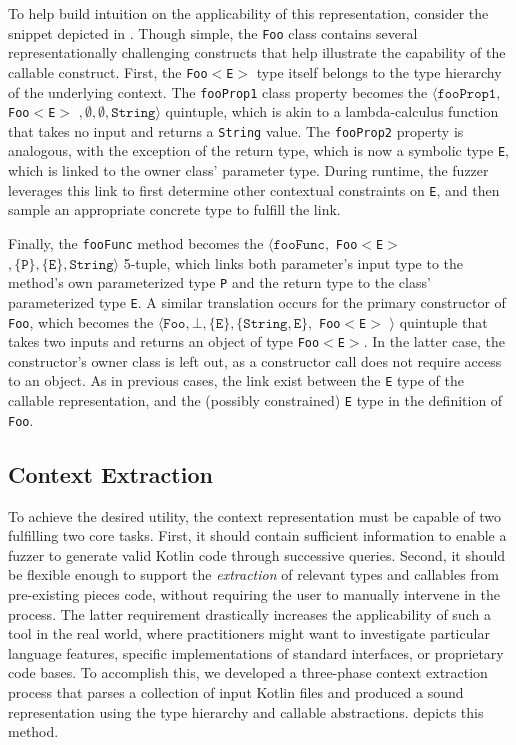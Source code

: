 To help build intuition on the applicability of this representation,
consider the snippet depicted in .
Though simple, the \texttt{Foo} class contains several representationally
challenging constructs that help illustrate the capability of the callable construct.
First, the \texttt{Foo$<$E$>$} type itself belongs to the type hierarchy
of the underlying context. 
The \texttt{fooProp1} class property becomes the
$\langle \texttt{fooProp1},$ \texttt{Foo$<$\texttt{E}$>$} $, \emptyset, \emptyset, \texttt{String} \rangle$
quintuple, which is akin to a lambda-calculus function that takes no input and returns a \texttt{String} value.
The \texttt{fooProp2} property is analogous, with the exception of the return type,
which is now a symbolic type \texttt{E}, which is linked to the owner class' parameter type.
During runtime, the fuzzer leverages this link to first determine other contextual constraints
on \texttt{E}, and then sample an appropriate concrete type to fulfill the link.

Finally, the \texttt{fooFunc} method becomes the 
$\langle \texttt{fooFunc},$ \texttt{Foo$<$\texttt{E}$>$} $,
\{ \texttt{P} \}, \{ \texttt{E} \}, \texttt{String} \rangle$
5-tuple, which links both parameter's input type to the method's
own parameterized type \texttt{P} and the return type to the 
class' parameterized type \texttt{E}.
A similar translation occurs for the primary constructor of \texttt{Foo},
which becomes the 
$\langle \texttt{Foo}, \bot, \{ \texttt{E} \}, 
\{ \texttt{String}, \texttt{E} \},$ \texttt{Foo$<$\texttt{E}$>$} $\rangle$
quintuple that takes two inputs and returns an object of type \texttt{Foo$<$E$>$}.
In the latter case, the constructor's owner class is left out,
as a constructor call does not require access to an object.
As in previous cases, the link exist between the \texttt{E} type of 
the callable representation, and the (possibly constrained)
\texttt{E} type in the definition of \texttt{Foo}.

\subsection{\label{subsec:context-extraction}Context Extraction}

To achieve the desired utility, the context representation
must be capable of two fulfilling two core tasks.
First, it should contain sufficient information to enable a fuzzer to generate valid Kotlin
code through successive queries.
Second, it should be flexible enough to support the \textit{extraction} of relevant types
and callables from pre-existing pieces code, without requiring the user to manually
intervene in the process.
The latter requirement drastically increases the applicability of such a tool in
the real world, where practitioners might want to investigate particular language features,
specific implementations of standard interfaces, or proprietary 
code bases. To accomplish this, we developed a three-phase context extraction
process that parses a collection of input Kotlin files and produced a
sound representation using the type hierarchy and callable abstractions.
 depicts this method.

